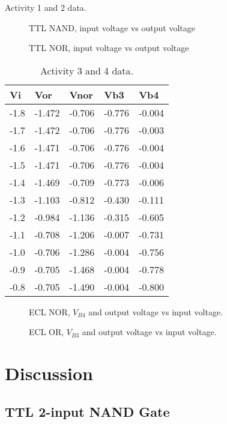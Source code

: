 \documentclass[10pt]{article}
\begin{document}
\begin{table}[H]
	\caption{Activity 1 and 2 data.}
\end{table}

\begin{figure}[H]
	\centering
	
	\caption{TTL NAND, input voltage vs output voltage}
	\label{fig:act-1}
\end{figure}
\begin{figure}[H]
	\centering
	
	\caption{TTL NOR, input voltage vs output voltage}
	\label{fig:act-2}
\end{figure}
\begin{table}[H]
	\centering
	\begin{tabularx}{0.6\linewidth}{X|X|X|X|X}
	Vi  & Vor   & Vnor  & Vb3   & Vb4		\\ \hline
	-1.8&	-1.472&	-0.706&	-0.776&	-0.004\\
	-1.7&	-1.472&	-0.706&	-0.776&	-0.003\\
	-1.6&	-1.471&	-0.706&	-0.776&	-0.004\\
	-1.5&	-1.471&	-0.706&	-0.776&	-0.004\\
	-1.4&	-1.469&	-0.709&	-0.773&	-0.006\\
	-1.3&	-1.103&	-0.812&	-0.430&	-0.111\\
	-1.2&	-0.984&	-1.136&	-0.315&	-0.605\\
	-1.1&	-0.708&	-1.206&	-0.007&	-0.731\\
	-1.0&	-0.706&	-1.286&	-0.004&	-0.756\\
	-0.9&	-0.705&	-1.468&	-0.004&	-0.778\\
	-0.8&	-0.705&	-1.490&	-0.004&	-0.800
	\end{tabularx}
	\caption{Activity 3 and 4 data.}
	\label{tbl:act-3-4}
\end{table}
\begin{figure}[H]
	\centering
	
	\caption{ECL NOR, $V_{B4}$ and output voltage vs input voltage.}
	\label{fig:act-3}
\end{figure}
\begin{figure}[H]
	\centering
	
	\caption{ECL OR, $V_{B3}$ and output voltage vs input voltage.}
	\label{fig:act-4}
\end{figure}

\section{Discussion}

\subsection{TTL 2-input NAND Gate}
\end{document}
